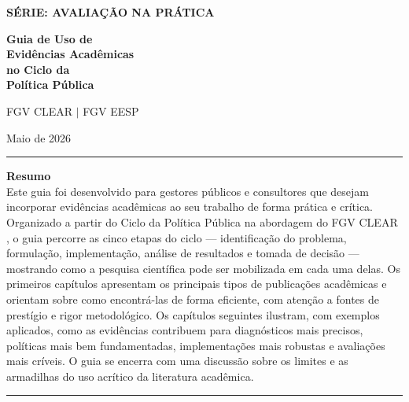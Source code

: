 \documentclass[12pt, a4paper, openany]{book}
\begin{document}
\frontmatter

\thispagestyle{empty}
\begin{center}
\vspace*{3cm}

{\Large\bfseries\color{clearlightblue} SÉRIE: AVALIAÇÃO NA PRÁTICA}

\vspace{1.5cm}

{\Huge\bfseries\color{clearblue}
  Guia de Uso de\\[0.3cm]
  Evidências Acadêmicas\\[0.3cm]
  no Ciclo da\\[0.3cm]
  Política Pública}

\vspace{2cm}

{\large FGV CLEAR $|$ FGV EESP}

\vspace{0.5cm}
{\large Maio de 2026}

\vfill

\vspace{0.5cm}
\noindent\textcolor{clearlightblue}{\rule{\textwidth}{0.6pt}}
\vspace{0.3cm}

\begin{minipage}{0.92\textwidth}
\centering
\vspace*{10em}
{\small\textbf{Resumo}}\\[0.4em]
\small\setlength{\parindent}{0pt}
Este guia foi desenvolvido para gestores públicos e consultores que
desejam incorporar evidências acadêmicas ao seu trabalho de forma prática e
crítica. Organizado a partir do Ciclo da Política Pública na abordagem do FGV
CLEAR \citep{Lima2025}, o guia percorre as cinco etapas do ciclo ---
identificação do problema, formulação, implementação, análise de resultados e
tomada de decisão --- mostrando como a pesquisa científica pode ser mobilizada
em cada uma delas. Os primeiros capítulos apresentam os principais tipos de
publicações acadêmicas e orientam sobre como encontrá-las de forma eficiente,
com atenção a fontes de prestígio e rigor metodológico. Os capítulos seguintes
ilustram, com exemplos aplicados, como as evidências contribuem para
diagnósticos mais precisos, políticas mais bem fundamentadas, implementações
mais robustas e avaliações mais críveis. O guia se encerra com uma discussão
sobre os limites e as armadilhas do uso acrítico da literatura acadêmica.
\end{minipage}

\vspace{0.3cm}
\noindent\textcolor{clearlightblue}{\rule{\textwidth}{0.6pt}}
\end{center}
\newpage
\end{document}

